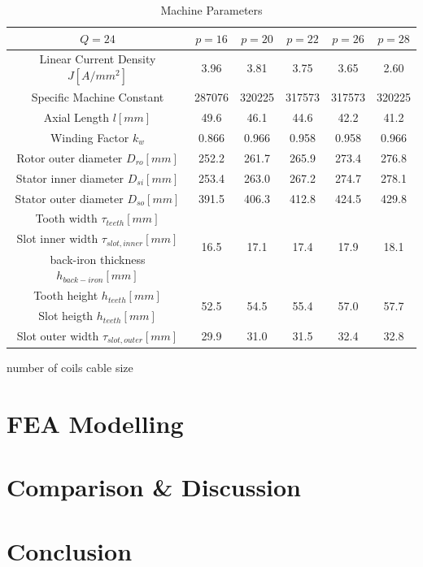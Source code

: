 \documentclass [a4 paper, 11pt, titlepage] {article}
\begin{document}
\begin{table}[h]
\begin{center}
\begin{tabular}{c|c|c|c|c|c}
				\hline
				$Q=24$ & $p=16$ & $p=20$ & $p=22$ & $p=26$ & $p=28$ \\
				\hline
				Linear Current Density $J [A/mm^2]$ & 3.96 & 3.81 & 3.75 & 3.65 & 2.60 \\
				Specific Machine Constant & 287076 & 320225 & 317573 & 317573 & 320225 \\
				Axial Length $l [mm]$ & 49.6 & 46.1 & 44.6 & 42.2 & 41.2 \\
				Winding Factor $k_w$ & 0.866 & 0.966 & 0.958 & 0.958 & 0.966 \\
				Rotor outer diameter $D_{ro} [mm]$ & 252.2 & 261.7 & 265.9 & 273.4 & 276.8 \\
				Stator inner diameter $D_{si} [mm]$ & 253.4 & 263.0 & 267.2 & 274.7 & 278.1 \\
				Stator outer diameter $D_{so} [mm]$ & 391.5 & 406.3 & 412.8 & 424.5 & 429.8 \\
				Tooth width $\tau_{teeth} [mm]$ & \multirow{3}{4em}{16.5} & \multirow{3}{4em}{17.1} & \multirow{3}{4em}{17.4} & \multirow{3}{4em}{17.9} & \multirow{3}{4em}{18.1} \\
				Slot inner width $\tau_{slot,inner} [mm]$ & & & & & \\
				back-iron thickness $h_{back-iron} [mm]$ & & & & & \\
				Tooth height $h_{teeth} [mm]$ & \multirow{2}{4em}{52.5} & \multirow{2}{4em}{54.5} & \multirow{2}{4em}{55.4} & \multirow{2}{4em}{57.0} & \multirow{2}{4em}{57.7} \\
				Slot heigth $h_{teeth} [mm]$ &  &  &  &  & \\
				Slot outer width $\tau_{slot,outer} [mm]$ & 29.9 & 31.0 & 31.5 & 32.4 & 32.8 \\
			\end{tabular}
		\end{center}
		\caption{Machine Parameters}
		\label{tab:EMparameters}
	\end{table}
	
	
	
	
					number of coils
				cable size
	
	\section{FEA Modelling}
	\section{Comparison \& Discussion}
	\section{Conclusion}
\end{document}
